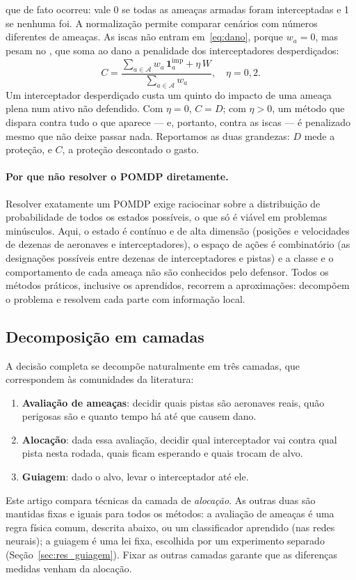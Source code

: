 \begin{itemize}
        que de fato ocorreu: vale 0 se todas as ameaças armadas foram interceptadas e 1 se nenhuma foi. A normalização
        permite comparar cenários com números diferentes de ameaças. As iscas não entram em~\eqref{eq:dano}, porque
        $w_a=0$, mas pesam no , que soma ao dano a penalidade dos interceptadores desperdiçados:
        \begin{equation}
          C = \frac{\sum_{a\in\mathcal{A}} w_a\,\mathbf{1}^{\mathrm{imp}}_a + \eta\,W}{\sum_{a\in\mathcal{A}} w_a},
          \quad \eta=0{,}2 .
          \label{eq:custo_ep}
        \end{equation}
        Um interceptador desperdiçado custa um quinto do impacto de uma ameaça plena num ativo não defendido. Com
        $\eta=0$, $C=D$; com $\eta>0$, um método que dispara contra tudo o que aparece --- e, portanto, contra as iscas ---
        é penalizado mesmo que não deixe passar nada. Reportamos as duas grandezas: $D$ mede a proteção, e $C$, a
        proteção descontado o gasto.
\end{itemize}

\paragraph{Por que não resolver o POMDP diretamente.} Resolver exatamente um POMDP exige raciocinar sobre a distribuição
de probabilidade de todos os estados possíveis, o que só é viável em problemas minúsculos. Aqui, o estado é contínuo e de
alta dimensão (posições e velocidades de dezenas de aeronaves e interceptadores), o espaço de ações é combinatório (as
designações possíveis entre dezenas de interceptadores e pistas) e a classe e o comportamento de cada ameaça não são
conhecidos pelo defensor. Todos os métodos práticos, inclusive os aprendidos, recorrem a aproximações: decompõem o
problema e resolvem cada parte com informação local.

\subsection{Decomposição em camadas}
A decisão completa se decompõe naturalmente em três camadas, que correspondem às comunidades da literatura:
\begin{enumerate}
  \item \textbf{Avaliação de ameaças}: decidir quais pistas são aeronaves reais, quão perigosas são e quanto tempo há até
        que causem dano.
  \item \textbf{Alocação}: dada essa avaliação, decidir qual interceptador vai contra qual pista nesta rodada, quais ficam
        esperando e quais trocam de alvo.
  \item \textbf{Guiagem}: dado o alvo, levar o interceptador até ele.
\end{enumerate}
Este artigo compara técnicas da camada de \emph{alocação}. As outras duas são mantidas fixas e iguais para todos os
métodos: a avaliação de ameaças é uma regra física comum, descrita abaixo, ou um classificador aprendido (nas redes
neurais); a guiagem é uma lei fixa, escolhida por um experimento separado (Seção~\ref{sec:res_guiagem}). Fixar as outras
camadas garante que as diferenças medidas venham da alocação.

